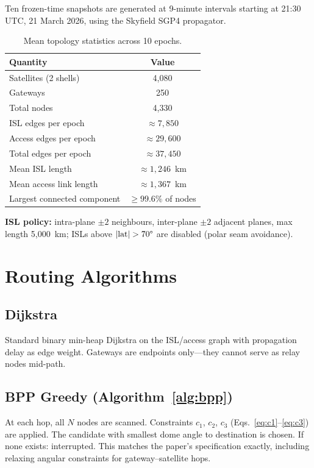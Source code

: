 \documentclass[12pt,a4paper]{report}
\begin{document}
Ten frozen-time snapshots are generated at 9-minute intervals starting at 21:30 UTC,
21 March 2026, using the Skyfield SGP4 propagator.

\begin{table}[H]
\centering
\caption{Mean topology statistics across 10 epochs.}
\label{tab:topology}
\begin{tabular}{lc}
\toprule
\textbf{Quantity} & \textbf{Value} \\
\midrule
Satellites (2 shells)            & 4{,}080 \\
Gateways                         & 250 \\
Total nodes                      & 4{,}330 \\
ISL edges per epoch              & $\approx 7{,}850$ \\
Access edges per epoch           & $\approx 29{,}600$ \\
Total edges per epoch            & $\approx 37{,}450$ \\
Mean ISL length                  & $\approx 1{,}246$~km \\
Mean access link length          & $\approx 1{,}367$~km \\
Largest connected component      & $\geq 99.6\%$ of nodes \\
\bottomrule
\end{tabular}
\end{table}

\textbf{ISL policy:} intra-plane $\pm 2$ neighbours, inter-plane $\pm 2$ adjacent
planes, max length 5{,}000~km; ISLs above $|\mathrm{lat}|>70\text{\textdegree}$ are
disabled (polar seam avoidance).

\section{Routing Algorithms}

\subsection{Dijkstra}
Standard binary min-heap Dijkstra on the ISL/access graph with propagation delay as
edge weight. Gateways are endpoints only---they cannot serve as relay nodes mid-path.

\subsection{BPP Greedy (Algorithm~\ref{alg:bpp})}
At each hop, all $N$ nodes are scanned. Constraints $c_1$, $c_2$, $c_3$
(Eqs.~\ref{eq:c1}--\ref{eq:c3}) are applied. The candidate with smallest dome angle
to destination is chosen. If none exists: interrupted. This matches the paper's
specification exactly, including relaxing angular constraints for gateway--satellite
hops.
\end{document}
